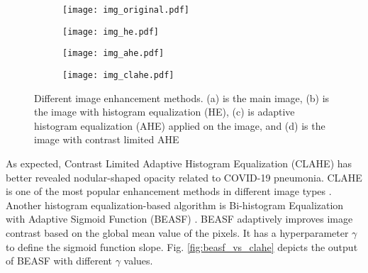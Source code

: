 \documentclass{article}
\begin{document}
\begin{figure}[H]
    \begin{subfigure}{0.24\linewidth}
        \centering
        \texttt{[image: img\_original.pdf]}
        \caption{}
        \label{fig:img_original}
    \end{subfigure}
    \hfill
    \begin{subfigure}{0.24\linewidth}
        \centering
        \texttt{[image: img\_he.pdf]}
        \caption{}
        \label{fig:img_he}
    \end{subfigure}
    \hfill
    \begin{subfigure}{0.24\linewidth}
        \centering
        \texttt{[image: img\_ahe.pdf]}
        \caption{}
        \label{fig:img_ahe}
    \end{subfigure}
    \hfill
    \begin{subfigure}{0.24\linewidth}
        \centering
        \texttt{[image: img\_clahe.pdf]}
        \caption{}
        \label{fig:img_clahe}
    \end{subfigure}

\caption{Different image enhancement methods. (a) is the main image, (b) is the image with histogram equalization (HE), (c) is adaptive histogram equalization (AHE) applied on the image, and (d) is the image with contrast limited AHE}
\label{fig:img_enhancements}
\end{figure}

\noindent As expected, Contrast Limited Adaptive Histogram Equalization (CLAHE) has better revealed nodular-shaped opacity related to COVID-19 pneumonia. CLAHE is one of the most popular enhancement methods in different image types \cite{pizer1987adaptive}. Another histogram equalization-based algorithm is Bi-histogram Equalization with Adaptive Sigmoid Function (BEASF) \cite{arriaga2014image}. BEASF adaptively improves image contrast based on the global mean value of the pixels. It has a hyperparameter \(\gamma\) to define the sigmoid function slope. Fig. \ref{fig:beasf_vs_clahe} depicts the output of BEASF with different \(\gamma\) values.
\end{document}
